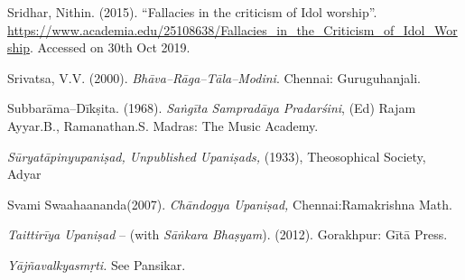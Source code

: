 \begin{thebibliography}{99}
  Sridhar, Nithin. (2015). “Fallacies in the criticism of Idol worship”. \url{https://www.academia.edu/25108638/Fallacies_in_the_Criticism_of_Idol_Worship}. Accessed on 30th Oct 2019.

  Srivatsa, V.V. (2000). \textit{Bhāva–Rāga–Tāla–Modini}. Chennai: Guruguhanjali.

  Subbarāma–Dīkṣita. (1968). \textit{Saṅgīta Sampradāya Pradarśini}, (Ed) Rajam Ayyar.B., Ramanathan.S. Madras: The Music Academy.

  \textit{Sūryatāpinyupaniṣad, Unpublished Upaniṣads,} (1933), Theosophical Society, Adyar

  Svami Swaahaananda(2007).\textit{ Chāndogya Upaniṣad,} Chennai:Ramakrishna Math.

  \textit{Taittirīya Upaniṣad} – (with \textit{Sāṅkara Bhaṣyam}). (2012). Gorakhpur: Gītā Press.

  \textit{Yājñavalkyasmṛti.} See Pansikar.

 \end{thebibliography}

\theendnotes

